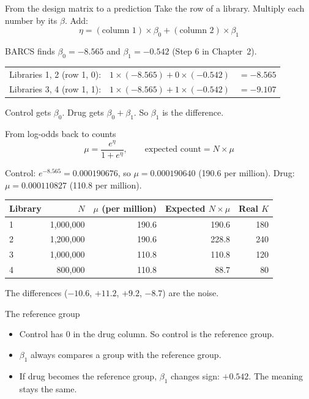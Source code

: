 \documentclass[aspectratio=169,11pt]{beamer}
\begin{document}
\begin{frame}{From the design matrix to a prediction}
Take the row of a library. Multiply each number by its $\beta$. Add:
\[
\eta = (\text{column 1}) \times \beta_0 + (\text{column 2}) \times \beta_1
\]
\begin{worked}[ 5: predictions]
BARCS finds $\beta_0 = -8.565$ and $\beta_1 = -0.542$ (Step 6 in
Chapter~2).

\begin{tabular}{@{}lll@{}}
Libraries 1, 2 (row 1, 0): & $1 \times (-8.565) + 0 \times (-0.542)$ & $= -8.565$\\
Libraries 3, 4 (row 1, 1): & $1 \times (-8.565) + 1 \times (-0.542)$ & $= -9.107$\\
\end{tabular}

Control gets $\beta_0$. Drug gets $\beta_0 + \beta_1$. So $\beta_1$ is the
difference.
\end{worked}
\end{frame}

\begin{frame}{From log-odds back to counts}
\[
\mu = \frac{e^{\eta}}{1 + e^{\eta}}, \qquad \text{expected count} = N \times \mu
\]
\begin{worked}
\small
Control: $e^{-8.565} = 0.000190676$, so $\mu = 0.000190640$ (190.6 per
million). Drug: $\mu = 0.000110827$ (110.8 per million).

\begin{tabular}{@{}lrrrr@{}}
\toprule
Library & $N$ & $\mu$ (per million) & Expected $N \times \mu$ & Real $K$\\
\midrule
1 & 1{,}000{,}000 & 190.6 & 190.6 & 180\\
2 & 1{,}200{,}000 & 190.6 & 228.8 & 240\\
3 & 1{,}000{,}000 & 110.8 & 110.8 & 120\\
4 &   800{,}000 & 110.8 &  88.7 &  80\\
\bottomrule
\end{tabular}

The differences ($-10.6$, $+11.2$, $+9.2$, $-8.7$) are the noise.
\end{worked}
\end{frame}

\begin{frame}{The reference group}
\begin{itemize}
\item Control has 0 in the drug column. So control is the
  \alert{reference group}.
\item $\beta_1$ always compares a group with the reference group.
\item If drug becomes the reference group, $\beta_1$ changes sign:
  $+0.542$. The meaning stays the same.
\end{itemize}
\end{frame}
\end{document}
